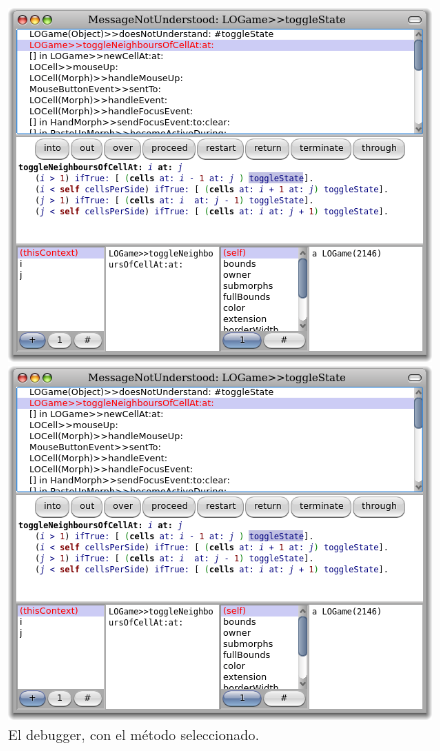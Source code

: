 \documentclass[a4paper,10pt,twoside]{book}
\begin{document}
\begin{figure}[ht]
\ifluluelse
	{\centerline {\includegraphics[width=\textwidth]{Debugger}}}
	{\centerline {\includegraphics[scale=0.7]{Debugger}}}
\caption{El debugger, con el m\'etodo   seleccionado.
}
\end{figure}
\end{document}
